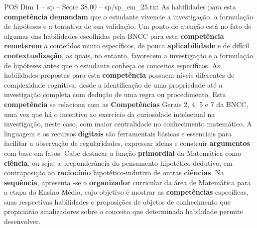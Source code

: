 \begin{textsample}{POS Dim 1 – sp – Score 38.00 – sp/sp\_em\_25.txt}
As habilidades para esta \textbf{competência} \textbf{demandam} que o estudante vivencie a investigação, a formulação de hipóteses e a tentativa de sua validação.
Um ponto de atenção está no fato de algumas das habilidades escolhidas pela BNCC para esta \textbf{competência} \textbf{remeterem} a conteúdos muito específicos, de pouca \textbf{aplicabilidade} e de difícil \textbf{contextualização}, as quais, no entanto, favorecem a investigação e a formulação de hipóteses antes que o estudante conheça os conceitos específicos.
As habilidades propostas para esta \textbf{competência} possuem níveis diferentes de complexidade cognitiva, desde a identificação de uma propriedade até a investigação completa com dedução de uma regra ou procedimento.
Esta \textbf{competência} se relaciona com as \textbf{Competências} Gerais 2, 4, 5 e 7 da BNCC, uma vez que há o incentivo ao exercício da curiosidade intelectual na investigação, neste caso, com maior centralidade no conhecimento matemático.
A linguagem e os recursos \textbf{digitais} são ferramentais básicas e essenciais para facilitar a observação de regularidades, expressar ideias e construir \textbf{argumentos} com base em fatos.
Cabe destacar a função \textbf{primordial} da Matemática como \textbf{ciência}, ou seja, a preponderância do pensamento hipotético-dedutivo, em contraposição ao \textbf{raciocínio} hipotético-indutivo de outras \textbf{ciências}.
Na \textbf{sequência}, apresenta -se o \textbf{organizador} curricular da área de Matemática para a etapa do Ensino Médio, cujo objetivo é mostrar as \textbf{competências} específicas, suas respectivas habilidades e proposições de objetos de conhecimento que propiciarão sinalizadores sobre o conceito que determinada habilidade permite desenvolver.

\end{textsample}
